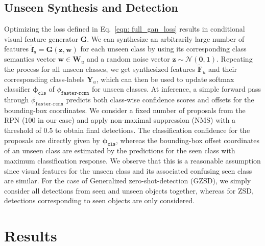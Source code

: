 \documentclass[runningheads]{llncs}
\begin{document}
\subsection{Unseen Synthesis and Detection}
Optimizing the loss defined in Eq.~\ref{eqn: full_gan_loss} results in conditional visual feature generator $\mathbf{G}$. We can synthesize an arbitrarily large number of features $\mathbf{\tilde{f}}_u=\mathbf{G}(\mathbf{z},\mathbf{w})$ for each unseen class by using its corresponding class semantics vector $\mathbf{w} \in \mathbf{W}_u$ and a random noise vector $\mathbf{z} \sim \mathcal{N}(\mathbf{0},\mathbf{1})$. Repeating the process for all unseen classes, we get synthesized features $\mathbf{\tilde{F}}_u$ and their corresponding class-labels $\mathbf{Y}_u$, which can then be used to update softmax classifier $\mathbf{\phi}_{\texttt{cls}}$ of $\phi_{\texttt{faster-rcnn}}$ for unseen classes. 
At inference, a simple forward pass through $\phi_{\texttt{faster-rcnn}}$ predicts both class-wise confidence scores and offsets for the bounding-box coordinates. We consider a fixed number of proposals from the RPN ($100$ in our case) and apply non-maximal suppression (NMS) with a threshold of $0.5$ to obtain final detections. The classification confidence for the proposals are directly given by $\mathbf{\phi}_{\texttt{cls}}$, whereas the bounding-box offset coordinates of an unseen class are estimated by the predictions for the seen class with maximum classification response. We observe that this is a reasonable assumption since visual features for the unseen class and its associated confusing seen class are similar. For the case of Generalized zero-shot-detection (GZSD), we simply consider all detections from seen and unseen objects together, whereas for ZSD, detections corresponding to seen objects are only considered. 








\section{Results}
\end{document}
